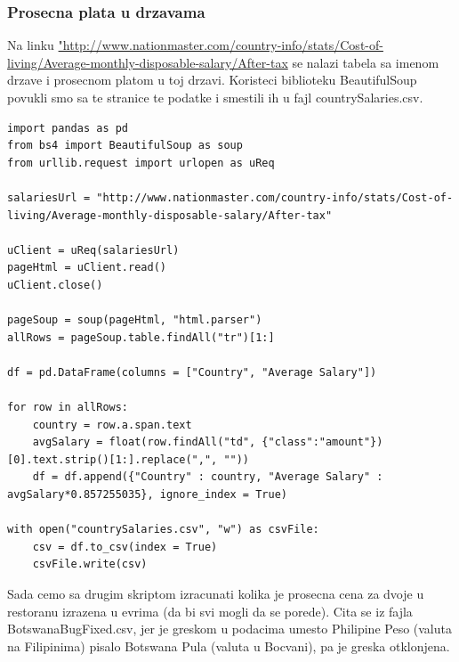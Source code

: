 \documentclass[11pt]{article} %
\begin{document}
\subsubsection{Prosecna plata u drzavama}
Na linku \url{"http://www.nationmaster.com/country-info/stats/Cost-of-living/Average-monthly-disposable-salary/After-tax} se nalazi tabela sa imenom drzave 
i prosecnom platom u toj drzavi. Koristeci biblioteku BeautifulSoup povukli smo sa te stranice te podatke i smestili ih u fajl countrySalaries.csv. 
\begin{lstlisting}
import pandas as pd
from bs4 import BeautifulSoup as soup
from urllib.request import urlopen as uReq

salariesUrl = "http://www.nationmaster.com/country-info/stats/Cost-of-living/Average-monthly-disposable-salary/After-tax"

uClient = uReq(salariesUrl)
pageHtml = uClient.read()
uClient.close()

pageSoup = soup(pageHtml, "html.parser")
allRows = pageSoup.table.findAll("tr")[1:]

df = pd.DataFrame(columns = ["Country", "Average Salary"])

for row in allRows:
    country = row.a.span.text
    avgSalary = float(row.findAll("td", {"class":"amount"})[0].text.strip()[1:].replace(",", ""))
    df = df.append({"Country" : country, "Average Salary" : avgSalary*0.857255035}, ignore_index = True)
    
with open("countrySalaries.csv", "w") as csvFile:
    csv = df.to_csv(index = True)
    csvFile.write(csv)

\end{lstlisting}
Sada cemo sa drugim skriptom izracunati kolika je prosecna cena za dvoje u restoranu izrazena u evrima (da bi svi mogli da se porede).
Cita se iz fajla BotswanaBugFixed.csv, jer je greskom u podacima umesto Philipine Peso (valuta na Filipinima) pisalo Botswana Pula (valuta u Bocvani), pa je
greska otklonjena.
\end{document}

